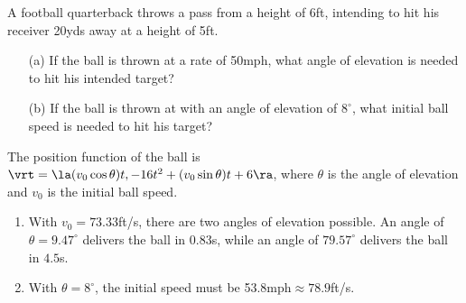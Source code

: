 {A football quarterback throws a pass from a height of 6ft, intending to hit his receiver 20yds away at a height of 5ft.
\begin{enumerate}
	\item [(a)] If the ball is thrown at a rate of 50mph, what angle of elevation is needed to hit his intended target?
	\item [(b)] If the ball is thrown at with an angle of elevation of $8^\circ$, what initial ball speed is needed to hit his target?
\end{enumerate}
}
{The position function of the ball is $\vrt = \la (v_0\cos\theta)t,-16t^2+(v_0\sin\theta)t+6\ra$, where $\theta$ is the angle of elevation and $v_0$ is the initial ball speed.
\begin{enumerate}
	\item With $v_0 = 73.33$ft/s, there are two angles of elevation possible. An angle of $\theta = 9.47^\circ$ delivers the ball in 0.83s, while an angle of $79.57^\circ$ delivers the ball in $4.5$s.
	\item	With $\theta=8^\circ$, the initial speed must be 53.8mph$\approx 78.9$ft/s.
	
\end{enumerate}
}